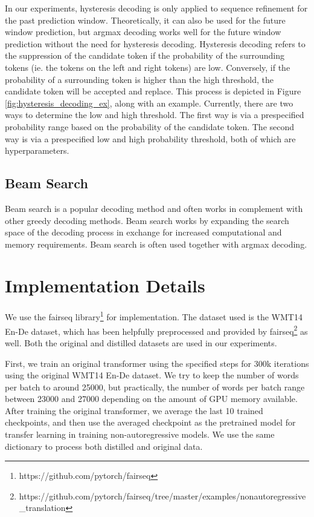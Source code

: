 In our experiments, hysteresis decoding is only applied to sequence refinement for the past prediction window. Theoretically, it can also be used for the future window prediction, but argmax decoding works well for the future window prediction without the need for hysteresis decoding. Hysteresis decoding refers to the suppression of the candidate token if the probability of the surrounding tokens (ie. the tokens on the left and right tokens) are low. Conversely, if the probability of a surrounding token is higher than the high threshold, the candidate token will be accepted and replace. This process is depicted in Figure \ref{fig:hysteresis_decoding_ex}, along with an example. Currently, there are two ways to determine the low and high threshold. The first way is via a prespecified probability range based on the probability of the candidate token. The second way is via a prespecified low and high probability threshold, both of which are hyperparameters. 

\subsection{Beam Search}


Beam search is a popular decoding method and often works in complement with other greedy decoding methods. Beam search works by expanding the search space of the decoding process in exchange for increased computational and memory requirements.  Beam search is often used together with argmax decoding.


\section{Implementation Details} \label{sec:implementation_details}
We use the fairseq library\footnote{https://github.com/pytorch/fairseq} for implementation. The dataset used is the WMT14 En-De dataset, which has been helpfully preprocessed and provided by fairseq\footnote{https://github.com/pytorch/fairseq/tree/master/examples/nonautoregressive\_translation} as well. Both the original and distilled datasets are used in our experiments.

First, we train an original transformer using the specified steps for 300k iterations using the original WMT14 En-De dataset. We try to keep the number of words per batch to around 25000, but practically, the number of words per batch range between 23000 and 27000 depending on the amount of GPU memory available. After training the original transformer, we average the last 10 trained checkpoints, and then use the averaged checkpoint as the pretrained model for transfer learning in training non-autoregressive models. We use the same dictionary to process both distilled and original data.

